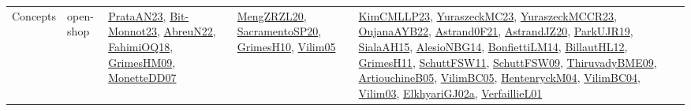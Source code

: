 {\begin{longtable}{lp{3cm}>{\raggedright}p{6cm}>{\raggedright}p{6cm}p{8cm}}
Concepts & open-shop & \href{articles/PrataAN23.pdf}{PrataAN23}\cite{PrataAN23}, \href{papers/Bit-Monnot23.pdf}{Bit-Monnot23}\cite{Bit-Monnot23}, \href{articles/AbreuN22.pdf}{AbreuN22}\cite{AbreuN22}, \href{articles/FahimiOQ18.pdf}{FahimiOQ18}\cite{FahimiOQ18}, \href{papers/GrimesHM09.pdf}{GrimesHM09}\cite{GrimesHM09}, \href{papers/MonetteDD07.pdf}{MonetteDD07}\cite{MonetteDD07} & \href{articles/MengZRZL20.pdf}{MengZRZL20}\cite{MengZRZL20}, \href{articles/SacramentoSP20.pdf}{SacramentoSP20}\cite{SacramentoSP20}, \href{papers/GrimesH10.pdf}{GrimesH10}\cite{GrimesH10}, \href{papers/Vilim05.pdf}{Vilim05}\cite{Vilim05} & \href{papers/KimCMLLP23.pdf}{KimCMLLP23}\cite{KimCMLLP23}, \href{papers/YuraszeckMC23.pdf}{YuraszeckMC23}\cite{YuraszeckMC23}, \href{articles/YuraszeckMCCR23.pdf}{YuraszeckMCCR23}\cite{YuraszeckMCCR23}, \href{papers/OujanaAYB22.pdf}{OujanaAYB22}\cite{OujanaAYB22}, \href{papers/Astrand0F21.pdf}{Astrand0F21}\cite{Astrand0F21}, \href{articles/AstrandJZ20.pdf}{AstrandJZ20}\cite{AstrandJZ20}, \href{papers/ParkUJR19.pdf}{ParkUJR19}\cite{ParkUJR19}, \href{papers/SialaAH15.pdf}{SialaAH15}\cite{SialaAH15}, \href{papers/AlesioNBG14.pdf}{AlesioNBG14}\cite{AlesioNBG14}, \href{papers/BonfiettiLM14.pdf}{BonfiettiLM14}\cite{BonfiettiLM14}, \href{papers/BillautHL12.pdf}{BillautHL12}\cite{BillautHL12}, \href{papers/GrimesH11.pdf}{GrimesH11}\cite{GrimesH11}, \href{articles/SchuttFSW11.pdf}{SchuttFSW11}\cite{SchuttFSW11}, \href{papers/SchuttFSW09.pdf}{SchuttFSW09}\cite{SchuttFSW09}, \href{papers/ThiruvadyBME09.pdf}{ThiruvadyBME09}\cite{ThiruvadyBME09}, \href{papers/ArtiouchineB05.pdf}{ArtiouchineB05}\cite{ArtiouchineB05}, \href{articles/VilimBC05.pdf}{VilimBC05}\cite{VilimBC05}, \href{papers/HentenryckM04.pdf}{HentenryckM04}\cite{HentenryckM04}, \href{papers/VilimBC04.pdf}{VilimBC04}\cite{VilimBC04}, \href{papers/Vilim03.pdf}{Vilim03}\cite{Vilim03}, \href{papers/ElkhyariGJ02a.pdf}{ElkhyariGJ02a}\cite{ElkhyariGJ02a}, \href{papers/VerfaillieL01.pdf}{VerfaillieL01}\cite{VerfaillieL01}\\

\end{longtable}}
